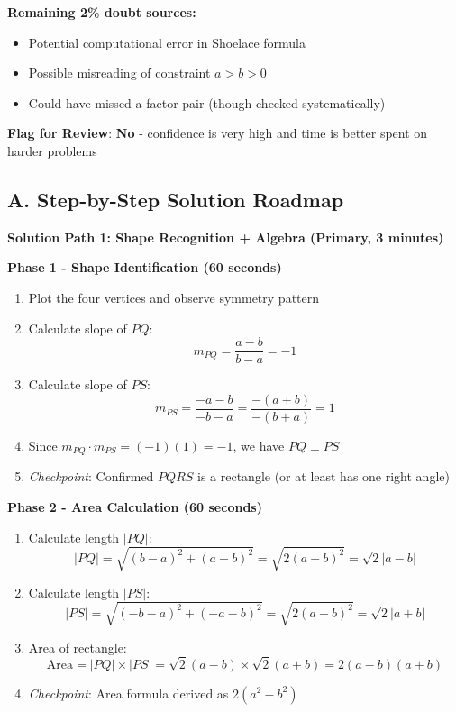 \documentclass[]{article}
\begin{document}
\begin{verificationbox}
\textbf{Remaining 2\% doubt sources:}
\begin{itemize}[leftmargin=*]
    \item Potential computational error in Shoelace formula
    \item Possible misreading of constraint $a>b>0$
    \item Could have missed a factor pair (though checked systematically)
\end{itemize}

\textbf{Flag for Review}: \textbf{No} - confidence is very high and time is better spent on harder problems
\end{verificationbox}

\begin{solutionbox}
\subsection*{A. Step-by-Step Solution Roadmap}

\textbf{Solution Path 1: Shape Recognition + Algebra (Primary, 3 minutes)}

\textbf{Phase 1 - Shape Identification (60 seconds)}
\begin{enumerate}
    \item Plot the four vertices and observe symmetry pattern
    \item Calculate slope of $PQ$: 
    $$m_{PQ} = \frac{a-b}{b-a} = -1$$
    \item Calculate slope of $PS$: 
    $$m_{PS} = \frac{-a-b}{-b-a} = \frac{-(a+b)}{-(b+a)} = 1$$
    \item Since $m_{PQ} \cdot m_{PS} = (-1)(1) = -1$, we have $PQ \perp PS$
    \item \textit{Checkpoint}: Confirmed $PQRS$ is a rectangle (or at least has one right angle)
\end{enumerate}

\textbf{Phase 2 - Area Calculation (60 seconds)}
\begin{enumerate}
    \item Calculate length $|PQ|$:
    $$|PQ| = \sqrt{(b-a)^2 + (a-b)^2} = \sqrt{2(a-b)^2} = \sqrt{2}|a-b|$$
    \item Calculate length $|PS|$:
    $$|PS| = \sqrt{(-b-a)^2 + (-a-b)^2} = \sqrt{2(a+b)^2} = \sqrt{2}|a+b|$$
    \item Area of rectangle:
    $$\text{Area} = |PQ| \times |PS| = \sqrt{2}(a-b) \times \sqrt{2}(a+b) = 2(a-b)(a+b)$$
    \item \textit{Checkpoint}: Area formula derived as $2(a^2-b^2)$
\end{enumerate}


\end{solutionbox}
\end{document}
